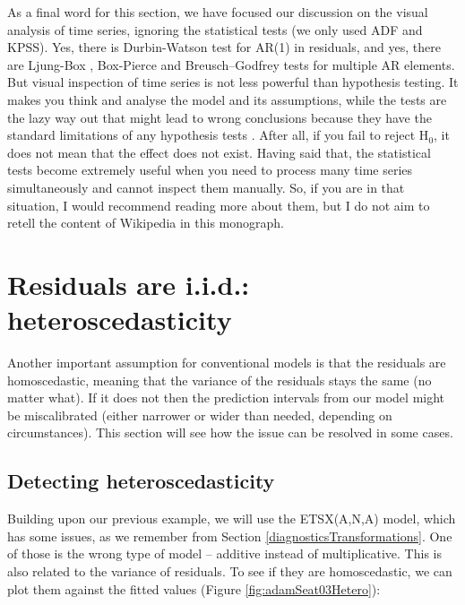 \documentclass[]{book}
\theoremstyle{definition}
\theoremstyle{definition}
\theoremstyle{definition}
\theoremstyle{definition}
\theoremstyle{remark}
\begin{document}
As a final word for this section, we have focused our discussion on the visual analysis of time series, ignoring the statistical tests (we only used ADF and KPSS). Yes, there is Durbin-Watson \citep{WikipediaDurbinWatson2021} test for AR(1) in residuals, and yes, there are Ljung-Box \citep{WikipediaLjungBox2021}, Box-Pierce and Breusch--Godfrey \citep{WikipediaBreuschGodfrey2021} tests for multiple AR elements. But visual inspection of time series is not less powerful than hypothesis testing. It makes you think and analyse the model and its assumptions, while the tests are the lazy way out that might lead to wrong conclusions because they have the standard limitations of any hypothesis tests \citep[as discussed in Section 5.3 of][]{SvetunkovSBA}. After all, if you fail to reject H\(_0\), it does not mean that the effect does not exist. Having said that, the statistical tests become extremely useful when you need to process many time series simultaneously and cannot inspect them manually. So, if you are in that situation, I would recommend reading more about them, but I do not aim to retell the content of Wikipedia in this monograph.

\hypertarget{diagnosticsResidualsIIDHetero}{%
\section{Residuals are i.i.d.: heteroscedasticity}\label{diagnosticsResidualsIIDHetero}}

Another important assumption for conventional models is that the residuals are homoscedastic, meaning that the variance of the residuals stays the same (no matter what). If it does not then the prediction intervals from our model might be miscalibrated (either narrower or wider than needed, depending on circumstances). This section will see how the issue can be resolved in some cases.

\hypertarget{detecting-heteroscedasticity}{%
\subsection{Detecting heteroscedasticity}\label{detecting-heteroscedasticity}}

Building upon our previous example, we will use the ETSX(A,N,A) model, which has some issues, as we remember from Section \ref{diagnosticsTransformations}. One of those is the wrong type of model -- additive instead of multiplicative. This is also related to the variance of residuals. To see if they are homoscedastic, we can plot them against the fitted values (Figure \ref{fig:adamSeat03Hetero}):
\end{document}
